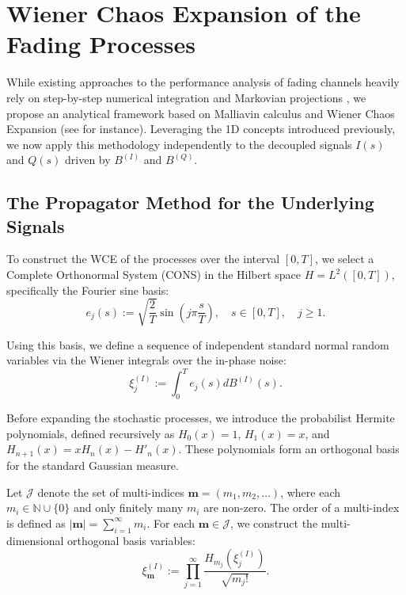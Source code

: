 \documentclass[11pt]{article}
\begin{document}
\section{Wiener Chaos Expansion of the Fading Processes}\label{sec:markovian}

While existing approaches to the performance analysis of fading channels heavily rely on step-by-step numerical integration and Markovian projections \citet{benamar2025stochastic}, we propose an analytical framework based on Malliavin calculus and Wiener Chaos Expansion (see \citet{alos2024malliavin} for instance). Leveraging the 1D concepts introduced previously, we now apply this methodology independently to the decoupled signals $I(s)$ and $Q(s)$ driven by $B^{(I)}$ and $B^{(Q)}$.

\subsection{The Propagator Method for the Underlying Signals} \label{sec:wiener}

To construct the WCE of the processes over the interval $[0,T]$, we select a Complete Orthonormal System (CONS) in the Hilbert space $H = L^2([0,T])$, specifically the Fourier sine basis:
\begin{equation}
    e_j(s) := \sqrt{\frac{2}{T}} \sin\left( j\pi \frac{s}{T} \right), \quad s \in [0,T], \quad j \geq 1.
\end{equation}

Using this basis, we define a sequence of independent standard normal random variables via the Wiener integrals over the in-phase noise:
\begin{equation}
    \xi_j^{(I)} := \int_0^T e_j(s) dB^{(I)}(s).
\end{equation}

Before expanding the stochastic processes, we introduce the probabilist Hermite polynomials, defined recursively as $H_0(x) = 1$, $H_1(x) = x$, and $H_{n+1}(x) = xH_n(x) - H'_{n}(x)$. These polynomials form an orthogonal basis for the standard Gaussian measure.

Let $\mathcal{J}$ denote the set of multi-indices $\mathbf{m} = (m_1, m_2, \dots)$, where each $m_i \in \mathbb{N} \cup \{0\}$ and only finitely many $m_i$ are non-zero. The order of a multi-index is defined as $|\mathbf{m}| = \sum_{i=1}^\infty m_i$. For each $\mathbf{m} \in \mathcal{J}$, we construct the multi-dimensional orthogonal basis variables:
\begin{equation}
    \xi_{\mathbf{m}}^{(I)} := \prod_{j=1}^\infty \frac{H_{m_j}(\xi_j^{(I)})}{\sqrt{m_j!}}.
\end{equation}
\end{document}
